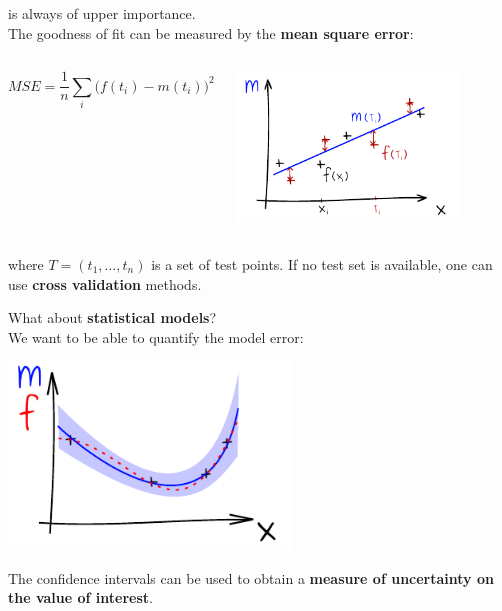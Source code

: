 \documentclass{beamer}
\begin{document}
\begin{frame}{}
\textbf{} is always of upper importance.\\ 
\vspace{3mm}
The goodness of fit can be measured by the \textbf{mean square error}:

\begin{columns}[c]
\column{4cm}
\begin{equation*}
MSE =  \frac{1}{n} \sum_i \big(f(t_i)-m(t_i) \big)^2
\end{equation*}
\column{5cm}
\begin{center}
  \includegraphics[height=4cm]{figures/ink_MSE}
\end{center}
\end{columns}
\vspace{2mm}
where $T = (t_1, \dots,t_n)$ is a set of test points. If no test set is available, one can use \textbf{cross validation} methods.
\end{frame}

\begin{frame}{}
What about \textbf{statistical models}? \\We want to be able to quantify the model error:
\begin{center}
\includegraphics[height=5cm]{figures/ink_mconfint}
\end{center}
The confidence intervals can be used to obtain a \textbf{measure of uncertainty on the value of interest}.
\end{frame}
\end{document}

